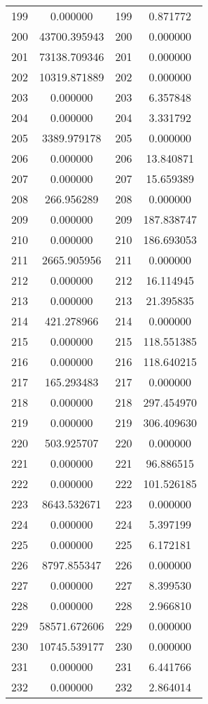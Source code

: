 \documentclass[12pt]{article}
\begin{document}
\begin{longtable}{@{}cccc@{}}
199 & 0.000000 & 199 & 0.871772 \\
200 & 43700.395943 & 200 & 0.000000 \\
201 & 73138.709346 & 201 & 0.000000 \\
202 & 10319.871889 & 202 & 0.000000 \\
203 & 0.000000 & 203 & 6.357848 \\
204 & 0.000000 & 204 & 3.331792 \\
205 & 3389.979178 & 205 & 0.000000 \\
206 & 0.000000 & 206 & 13.840871 \\
207 & 0.000000 & 207 & 15.659389 \\
208 & 266.956289 & 208 & 0.000000 \\
209 & 0.000000 & 209 & 187.838747 \\
210 & 0.000000 & 210 & 186.693053 \\
211 & 2665.905956 & 211 & 0.000000 \\
212 & 0.000000 & 212 & 16.114945 \\
213 & 0.000000 & 213 & 21.395835 \\
214 & 421.278966 & 214 & 0.000000 \\
215 & 0.000000 & 215 & 118.551385 \\
216 & 0.000000 & 216 & 118.640215 \\
217 & 165.293483 & 217 & 0.000000 \\
218 & 0.000000 & 218 & 297.454970 \\
219 & 0.000000 & 219 & 306.409630 \\
220 & 503.925707 & 220 & 0.000000 \\
221 & 0.000000 & 221 & 96.886515 \\
222 & 0.000000 & 222 & 101.526185 \\
223 & 8643.532671 & 223 & 0.000000 \\
224 & 0.000000 & 224 & 5.397199 \\
225 & 0.000000 & 225 & 6.172181 \\
226 & 8797.855347 & 226 & 0.000000 \\
227 & 0.000000 & 227 & 8.399530 \\
228 & 0.000000 & 228 & 2.966810 \\
229 & 58571.672606 & 229 & 0.000000 \\
230 & 10745.539177 & 230 & 0.000000 \\
231 & 0.000000 & 231 & 6.441766 \\
232 & 0.000000 & 232 & 2.864014 \\

\end{longtable}
\end{document}
